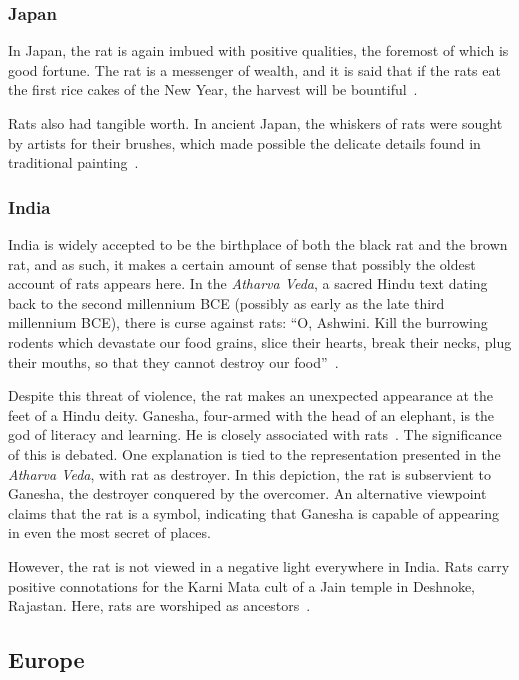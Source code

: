 \documentclass[12pt]{article}
\begin{document}
\subsubsection{Japan} \label{Japan}

In Japan, the rat is again imbued with positive qualities, the foremost of which is good fortune. The rat is a messenger of wealth, and it is said that if the rats eat the first rice cakes of the New Year, the harvest will be bountiful~\cite{Marrin2006}.

Rats also had tangible worth. In ancient Japan, the whiskers of rats were sought by artists for their brushes, which made possible the delicate details found in traditional painting~\cite{Barnett2001}.

\subsubsection{India} \label{India}

India is widely accepted to be the birthplace of both the black rat and the brown rat, and as such, it makes a certain amount of sense that possibly the oldest account of rats appears here. In the \textit{Atharva Veda}, a sacred Hindu text dating back to the second millennium BCE (possibly as early as the late third millennium BCE), there is curse against rats: ``O, Ashwini. Kill the burrowing rodents which devastate our food grains, slice their hearts, break their necks, plug their mouths, so that they cannot destroy our food''~\cite{Barnett2001}.

Despite this threat of violence, the rat makes an unexpected appearance at the feet of a Hindu deity. Ganesha, four-armed with the head of an elephant, is the god of literacy and learning. He is closely associated with rats~\cite{Barnett2001}. The significance of this is debated. One explanation is tied to the representation presented in the \textit{Atharva Veda}, with rat as destroyer. In this depiction, the rat is subservient to Ganesha, the destroyer conquered by the overcomer. An alternative viewpoint claims that the rat is a symbol, indicating that Ganesha is capable of appearing in even the most secret of places.

However, the rat is not viewed in a negative light everywhere in India. Rats carry positive connotations for the Karni Mata cult of a Jain temple in Deshnoke, Rajastan. Here, rats are worshiped as ancestors~\cite{Edelman2005}.

\subsection{Europe} \label{Europe}
\end{document}
